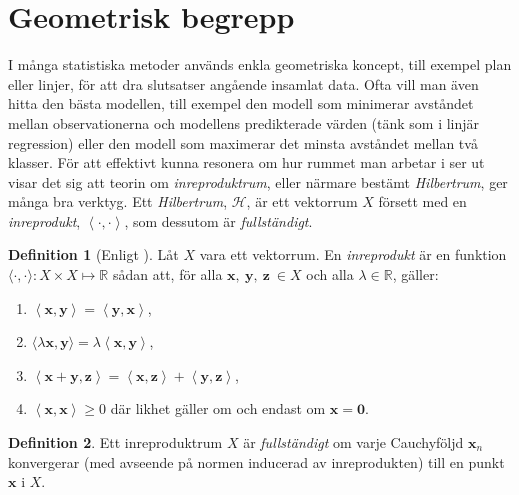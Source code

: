 \documentclass[a4paper, 12pt]{report}
\theoremstyle{definition}
\newtheorem{defi}{Definition}[section]
\theoremstyle{remark}
\newcommand{\llangle}{\left\langle}
\newcommand{\rrangle}{\right\rangle}
\newcommand{\inprod}[2]{\llangle \mathbf{#1}, \mathbf{#2}\rrangle}
\begin{document}
\section{Geometrisk begrepp}
I många statistiska metoder används enkla geometriska koncept, till exempel plan eller linjer, för att dra slutsatser angående insamlat data.
Ofta vill man även hitta den bästa modellen, till exempel den modell som minimerar avståndet mellan observationerna och modellens predikterade värden (tänk som i linjär regression) eller den modell som maximerar det minsta avståndet mellan två klasser.
För att effektivt kunna resonera om hur rummet man arbetar i ser ut visar det sig att teorin om \emph{inreproduktrum}, eller närmare bestämt \emph{Hilbertrum}, ger många bra verktyg.
Ett \emph{Hilbertrum}, $\mathcal{H}$, är ett vektorrum $X$ försett med en \emph{inreprodukt}, $\llangle \cdot, \cdot\rrangle$, som dessutom är \emph{fullständigt}.

\begin{defi}[Enligt \cite{Young}]\label{def:inreprodukt}
	Låt $X$ vara ett vektorrum. En \emph{inreprodukt} är en funktion $\langle \cdot , \cdot \rangle: X\times X \longmapsto \mathbb{R}$ sådan att, för alla $\mathbf{x},~\mathbf{y},~\mathbf{z}~\in X$ och alla $\lambda \in \mathbb{R}$, gäller:
	\begin{enumerate}[label=\textbf{IP\arabic*}]
		\item \label{IP1} $\inprod{x}{y} = \inprod{y}{x}$,
		\item \label{IP2} $\langle \lambda \mathbf{x}, \mathbf{y}\rangle = \lambda \inprod{x}{y}$,
		\item \label{IP3} $\inprod{x+y}{z} =\inprod{x}{z} + \inprod{y}{z}$,
		\item \label{IP4} $\inprod{x}{x} \geq 0$ där likhet gäller om och endast om $\mathbf{x} = \mathbf{0}$. 
	\end{enumerate}
\end{defi}

\begin{defi}\label{def:Cfull}
	Ett inreproduktrum $X$ är \emph{fullständigt} om varje Cauchyföljd $\mathbf{x}_n$ konvergerar (med avseende på normen inducerad av inreprodukten) till en punkt $\mathbf{x}$ i $X$.
\end{defi}
\end{document}
